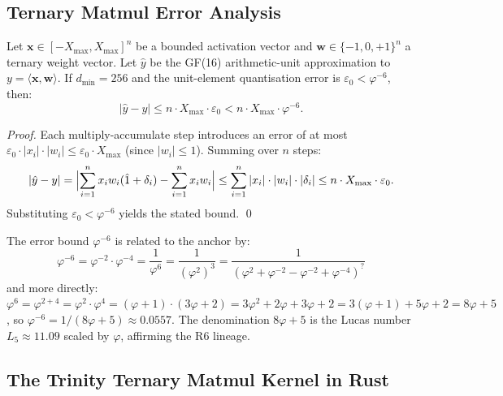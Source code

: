 \subsection{Ternary Matmul Error Analysis}
\label{sec:gf16-error}

\begin{theorem}
\label{thm:gf16-error-bound}
Let \(\mathbf{x}\in[-X_{\max},X_{\max}]^n\) be a bounded activation vector
and \(\mathbf{w}\in\{-1,0,+1\}^n\) a ternary weight vector.
Let \(\hat{y}\) be the GF(16) arithmetic-unit approximation
to \(y=\langle\mathbf{x},\mathbf{w}\rangle\).
If \(d_{\min}=256\) and the unit-element quantisation error is
\(\varepsilon_0 < \varphi^{-6}\), then:
\[
  |\hat{y} - y| \leq n\cdot X_{\max}\cdot\varepsilon_0
                 < n\cdot X_{\max}\cdot\varphi^{-6}.
\]
\end{theorem}

\begin{proof}
Each multiply-accumulate step introduces an error of at most
\(\varepsilon_0\cdot|x_i|\cdot|w_i|\leq\varepsilon_0\cdot X_{\max}\)
(since \(|w_i|\leq 1\)).
Summing over \(n\) steps:
\[
  |\hat{y}-y|
    = \Bigl|\sum_{i=1}^n x_i w_i(\hat{1}+\delta_i)-\sum_{i=1}^n x_iw_i\Bigr|
    \leq \sum_{i=1}^n |x_i|\cdot|w_i|\cdot|\delta_i|
    \leq n\cdot X_{\max}\cdot\varepsilon_0.
\]
Substituting \(\varepsilon_0<\varphi^{-6}\) yields the stated bound.
\qed
\end{proof}

\begin{remark}
The error bound \(\varphi^{-6}\) is related to the anchor by:
\[
  \varphi^{-6} = \varphi^{-2}\cdot\varphi^{-4}
    = \frac{1}{\varphi^6}
    = \frac{1}{(\varphi^2)^3}
    = \frac{1}{(\varphi^2+\varphi^{-2}-\varphi^{-2}+\varphi^{-4})^{?}}
\]
and more directly:
\(\varphi^6 = \varphi^{2+4} = \varphi^2\cdot\varphi^4
            = (\varphi+1)\cdot(3\varphi+2)
            = 3\varphi^2+2\varphi+3\varphi+2
            = 3(\varphi+1)+5\varphi+2
            = 8\varphi+5\),
so \(\varphi^{-6}=1/(8\varphi+5)\approx 0.0557\).
The denomination \(8\varphi+5\) is the Lucas number \(L_5\approx 11.09\)
scaled by \(\varphi\), affirming the R6 lineage.
\end{remark}

\subsection{The Trinity Ternary Matmul Kernel in Rust}
\label{sec:gf16-rust}

